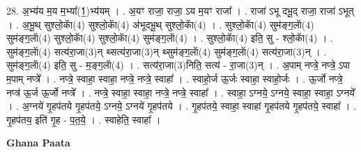 \documentclass[17pt]{extarticle}
\begin{document}
28. अ॒भ्य॑य म॒य म॒भ्या᳚(1॒)भ्य॑यम् । . अ॒यꣳ राजा॒ राजा॒ ऽय म॒यꣳ राजा᳚ । . राजा॑ ऽभू दभू॒द् राजा॒ राजा॑ ऽभूत् । . अ॒भू॒थ् सुश्लो॒काॅ(4) सुश्लो॒काॅ(4) अ॑भूदभू॒थ् सुश्लो॒काॅ(4) । . सुश्लो॒काॅ(4) सुम॑ङ्ग॒लाॅ(4) सुम॑ङ्ग॒लाॅ(4) सुश्लो॒काॅ(4) सुश्लो॒काॅ(4) सुम॑ङ्ग॒लाॅ(4) । . सुश्लो॒काॅ(4) इति॒ सु - श्लो॒काॅ(4) । . सुम॑ङ्ग॒लाॅ(4) सत्य॑रा॒जा(3)न् थ्सत्य॑रा॒जा(3)न् थ्सुम॑ङ्ग॒लाॅ(4) सुम॑ङ्ग॒लाॅ(4) सत्य॑रा॒जा(3)न् । . सुम॑ङ्ग॒लाॅ(4) इति॒ सु - म॒ङ्ग॒लाॅ(4) । . सत्य॑रा॒जा(3)निति॒ सत्य॑ - रा॒जा(3)न् । . अ॒पाम् नप्त्रे॒ नप्त्रे॒ ऽपा म॒पाम् नप्त्रे᳚ । . नप्त्रे॒ स्वाहा॒ स्वाहा॒ नप्त्रे॒ नप्त्रे॒ स्वाहा᳚ । . स्वाहो॒र्ज ऊ॒र्जः स्वाहा॒ स्वाहो॒र्जः । . ऊ॒र्जो नप्त्रे॒ नप्त्र॑ ऊ॒र्ज ऊ॒र्जो नप्त्रे᳚ । . नप्त्रे॒ स्वाहा॒ स्वाहा॒ नप्त्रे॒ नप्त्रे॒ स्वाहा᳚ । . स्वाहा॒ ऽग्नये॒ ऽग्नये॒ स्वाहा॒ स्वाहा॒ ऽग्नये᳚ । . अ॒ग्नये॑ गृ॒हप॑तये गृ॒हप॑तये॒ ऽग्नये॒ ऽग्नये॑ गृ॒हप॑तये । . गृ॒हप॑तये॒ स्वाहा॒ स्वाहा॑ गृ॒हप॑तये गृ॒हप॑तये॒ स्वाहा᳚ । . गृ॒हप॑तय॒ इति॑ गृ॒ह - प॒त॒ये॒ । . स्वाहेति॒ स्वाहा᳚ । \newline

\textbf{Ghana Paata } \newline
\end{document}
